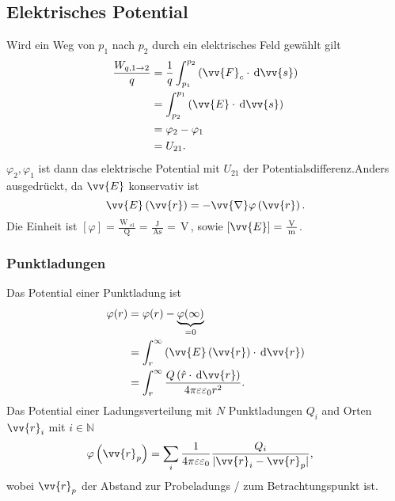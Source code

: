\subsection{Elektrisches Potential}
Wird ein Weg von $p_1$ nach $p_2$ durch ein elektrisches Feld gewählt gilt
\begin{align*}
        \dfrac{W_{q,1\rightarrow 2}}{q}&=\dfrac{1}{q}\int_{p_1}^{p_2}\left(\vv{F}_c\cdot \td \vv{s}\right)\\
                                       &=\int_{p_2}^{p_1}\left(\vv{E}\cdot \td \vv{s}\right)\\
                                       &=\varphi _2-\varphi _1\\
                                       &=U_{21}
.\end{align*}
$\varphi _2,\varphi _1$ ist dann das elektrische Potential mit $U_{21}$ der Potentialsdifferenz.Anders ausgedrückt, da $\vv{E}$ konservativ ist
\[ 
        \vv{E}\left(\vv{r}\right)=-\vv{\nabla }\varphi \left(\vv{r}\right)
.\] 
Die Einheit ist $[\varphi ]=\tfrac{\,\text{W}\,_{\,\text{el}\,}}{\,\text{Q}\,}=\tfrac{\,\text{J}\,}{\,\text{As}\,}=\,\text{V}\,$, sowie $[\vv{E}]=\tfrac{\,\text{V}\,}{\,\text{m}\,}$.

\subsubsection{Punktladungen}
Das Potential einer Punktladung ist
\begin{align*}
        \varphi (r)&=\varphi (r)-\underbrace{\varphi (\infty)}_{=0}\\
                   &=\int_{r}^{\infty}\left(\vv{E}\left(\vv{r}\right)\cdot \td \vv{r}\right)\\
                   &=\int_{r}^{\infty}\dfrac{Q\left(\hat{r}\cdot \td \vv{r}\right)}{4\pi \varepsilon \varepsilon _0r^2}
.\end{align*}
Das Potential einer Ladungsverteilung mit $N$ Punktladungen $Q_i$ and Orten $\vv{r}_i$ mit $i \in \mathbb{N}$ 
\begin{align*}
        \varphi \left(\vv{r}_p\right)&=\sum_{i}^{}\dfrac{1}{4\pi \varepsilon \varepsilon _0}\dfrac{Q_i}{|\vv{r}_i-\vv{r}_p|}
,\end{align*}
wobei $\vv{r}_p$ der Abstand zur Probeladungs / zum Betrachtungspunkt ist.

